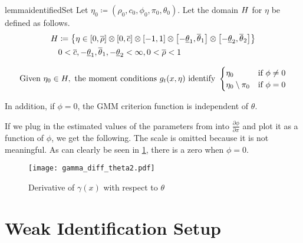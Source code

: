\documentclass[11pt, letterpaper, twoside, final]{article}
\begin{document}
\begin{restatable}{lemma}{identifiedSet}
    \label{lemma:IdentifiedSet}
    Let $\eta_0 \coloneqq \left(\rho_0, c_0, \phi_0, \pi_0, \theta_0\right)$.
    Let the domain $H$ for $\eta$ be defined as follows. 
    \begin{equation}
    \begin{split}
        H &\coloneqq \left\{ \eta \in  [0, \overline{\rho}] \otimes [0, \overline{c}] \otimes \left[-1,
            1\right] \otimes \left[-\underline{\theta}_1, \overline{\theta}_1\right] \otimes
            \left[-\underline{\theta}_2, \overline{\theta}_2\right]\right\} \\
        &0 < \overline{c}, -\underline{\theta}_1, \overline{\theta}_1, -\underline{\theta}_2 < \infty, 0 <
            \overline{\rho} < 1
    \end{split}
    \end{equation}


    \begin{equation}
        \text{Given}\ \eta_0 \in \Eta,\ \text{the moment conditions}\ g_t(x, \eta)\ \text{identify}\
    \begin{cases}
        \eta_0                  &\text{if}\ \phi \neq 0 \\
        \eta_0 \setminus \pi_0  &\text{if}\ \phi = 0
    \end{cases}
    \label{eqn:EtaDefn}
    \end{equation}

    In addition, if $\phi = 0$, the GMM criterion function is independent of $\theta$.
\end{restatable}


If we plug in the estimated values of the parameters from \textcite{khrapov2016affine} into $\frac{\partial
\phi}{\partial \pi}$ and plot it as a function of $\phi$,  we get the following.
The scale is omitted because it is not meaningful. 
As can clearly be seen in \cref{fig:fig:gamma_diff_theta2}, there is a zero when $\phi = 0$.

\begin{figure}[htb]
    \centering
    \caption{Derivative of $\gamma(x)$ with respect to $\theta$}
    \label{fig:fig:gamma_diff_theta2}
    \texttt{[image: gamma\_diff\_theta2.pdf]}
\end{figure}


\section{Weak Identification Setup}
\end{document}
